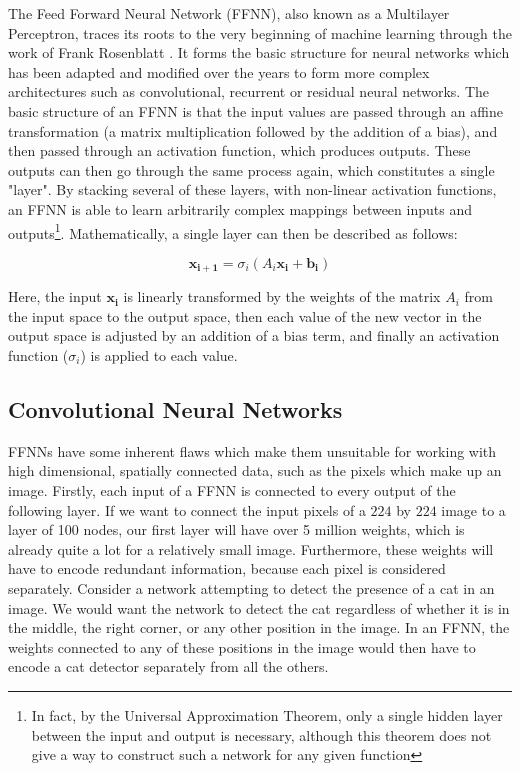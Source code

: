 \documentclass[UKenglish]{uiomasterthesis} %
\theoremstyle{definition}
\begin{document}
The Feed Forward Neural Network (FFNN), also known as a Multilayer Perceptron, traces its roots to the very beginning of machine learning through the work of Frank Rosenblatt \cite{rosenblatt}. It forms the basic structure for neural networks which has been adapted and modified over the years to form more complex architectures such as convolutional, recurrent or residual neural networks. The basic structure of an FFNN is that the input values are passed through an affine transformation (a matrix multiplication followed by the addition of a bias), and then passed through an activation function, which produces outputs. These outputs can then go through the same process again, which constitutes a single "layer". By stacking several of these layers, with non-linear activation functions, an FFNN is able to learn arbitrarily complex mappings between inputs and outputs\footnote{In fact, by the Universal Approximation Theorem, only a single hidden layer between the input and output is necessary, although this theorem does not give a way to construct such a network for any given function}. Mathematically, a single layer can then be described as follows:

\begin{equation}
\bm{x_{i+1}} = \sigma_i (A_i \bm{x_i} + \bm{b_i})
\label{ffnn}
\end{equation}

Here, the input $\bm{x_i}$ is linearly transformed by the weights of the matrix $A_i$ from the input space to the output space, then each value of the new vector in the output space is adjusted by an addition of a bias term, and finally an activation function ($\sigma_i$) is applied to each value. 


\subsection{Convolutional Neural Networks}

FFNNs have some inherent flaws which make them unsuitable for working with high dimensional, spatially connected data, such as the pixels which make up an image. Firstly, each input of a FFNN is connected to every output of the following layer. If we want to connect the input pixels of a $224$ by $224$ image to a layer of 100 nodes, our first layer will have over 5 million weights, which is already quite a lot for a relatively small image. Furthermore, these weights will have to encode redundant information, because each pixel is considered separately. Consider a network attempting to detect the presence of a cat in an image. We would want the network to detect the cat regardless of whether it is in the middle, the right corner, or any other position in the image. In an FFNN, the weights connected to any of these positions in the image would then have to encode a cat detector separately from all the others.
\end{document}
